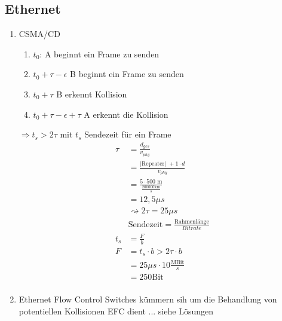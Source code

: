 \subsection{Ethernet}
\begin{enumerate}
	\item CSMA/CD
	\begin{enumerate}
		\item \(t_0\): A beginnt ein Frame zu senden
		\item \(t_0 + \tau - \epsilon\) B beginnt ein Frame zu senden
		\item \(t_0 + \tau \) B erkennt Kollision
		\item \(t_0 + \tau - \epsilon + \tau\) A erkennt die Kollision
	\end{enumerate}
	\(\Rightarrow t_s > 2\tau \) mit \(t_s\) Sendezeit für ein Frame
	\begin{align*}
	\tau &= \frac{d_{ges}}{v_{phy}}\\
	&= \frac{\text{|Repeater| }+1 \cdot d}{v_{phy}}\\
	&= \frac{5\cdot 500 \text{ m}}{\frac{200000 \text{km}}{s}}\\
	&= 12,5 \mu s\\
	&\rightsquigarrow 2\tau = 25 \mu s\\
	&\text{Sendezeit} = \frac{\text{Rahmenlänge}}{Bitrate}\\
	t_s &= \frac{F}{b}\\
	F &= t_s \cdot b > 2\tau \cdot b\\
	&= 25\mu s \cdot 10 \frac{\text{MBit}}{s}\\
	&= 250 \text{Bit}\\
	\end{align*}
	\item Ethernet Flow Control
	Switches kümmern sih um die Behandlung von potentiellen Kollisionen EFC dient ... siehe Lösungen
\end{enumerate}
